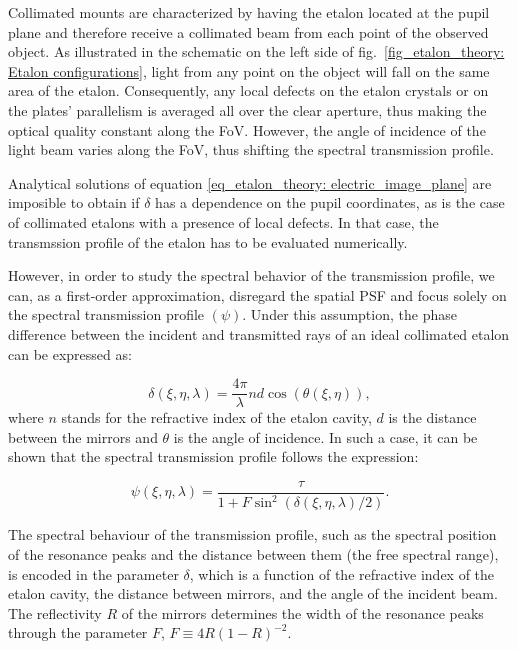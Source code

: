Collimated mounts are characterized by having the etalon located at the pupil plane and therefore receive a collimated beam from each point of the observed object. As illustrated in the schematic on the left side of fig.~{\ref{fig_etalon_theory: Etalon configurations}}, light from any point on the object will fall on the same area of the etalon. Consequently, any local defects on the etalon crystals or on the plates' parallelism is averaged all over the clear aperture, thus making the optical quality constant along the FoV. However, the angle of incidence of the light beam varies along the FoV, thus shifting the spectral transmission profile.  

Analytical solutions of equation \eqref{eq_etalon_theory: electric_image_plane} are imposible to obtain if $\delta$ has a dependence on the pupil coordinates, as is the case of collimated etalons with a presence of local defects. In that case, the transmssion profile of the etalon has to be evaluated numerically. 

However, in order to study the spectral behavior of the transmission profile, we can, as a first-order approximation, disregard the spatial PSF and focus solely on the spectral transmission profile $(\psi)$. Under this assumption, the phase difference between the incident and transmitted rays of an ideal collimated etalon can be expressed as:  

\begin{equation}
  \delta (\xi, \eta, \lambda) = \frac{4\pi}{\lambda}nd\cos (\theta(\xi, \eta)),
  \label{eq_etalon_theory: collimated_delta}
\end{equation}
where $n$ stands for the refractive index of the etalon cavity, $d$ is the distance between the mirrors and $\theta$ is the angle of incidence. In such a case, it can be shown that the spectral transmission profile follows the expression: 

\begin{equation}
  \psi\left(\xi, \eta, \lambda \right) = \frac{\tau}{1 + F \sin ^2 (\delta(\xi, \eta, \lambda) / 2)}.
  \label{eq_eta_theory : Collimated_profile}
\end{equation}

The spectral behaviour of the transmission profile, such as the spectral position of the resonance peaks and the distance between them (the free spectral range), is encoded in the parameter $\delta$, which is a function of the refractive index of the etalon cavity, the distance between mirrors, and the angle of the incident beam. The reflectivity $R$ of the mirrors determines the width of the resonance peaks through the parameter $F$, $F \equiv 4R (1 - R )^{-2}$.

